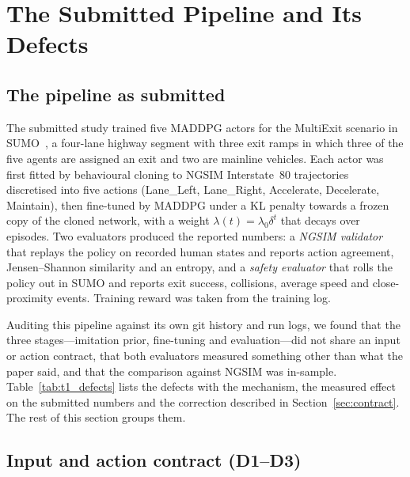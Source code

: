 \section{The Submitted Pipeline and Its Defects}
\label{sec:defects}

\subsection{The pipeline as submitted}
\label{sec:pipeline}

The submitted study trained five MADDPG actors for the MultiExit scenario in SUMO~\cite{lopez2018microscopic}, a four-lane highway segment with three exit ramps in which three of the five agents are assigned an exit and two are mainline vehicles. Each actor was first fitted by behavioural cloning to NGSIM Interstate~80 trajectories~\cite{ngsim2006} discretised into five actions (Lane\_Left, Lane\_Right, Accelerate, Decelerate, Maintain), then fine-tuned by MADDPG under a KL penalty towards a frozen copy of the cloned network, with a weight $\lambda(t)=\lambda_0\delta^t$ that decays over episodes. Two evaluators produced the reported numbers: a \emph{NGSIM validator} that replays the policy on recorded human states and reports action agreement, Jensen--Shannon similarity and an entropy, and a \emph{safety evaluator} that rolls the policy out in SUMO and reports exit success, collisions, average speed and close-proximity events. Training reward was taken from the training log.

Auditing this pipeline against its own git history and run logs, we found that the three stages---imitation prior, fine-tuning and evaluation---did not share an input or action contract, that both evaluators measured something other than what the paper said, and that the comparison against NGSIM was in-sample. Table~\ref{tab:t1_defects} lists the defects with the mechanism, the measured effect on the submitted numbers and the correction described in Section~\ref{sec:contract}. The rest of this section groups them.

\subsection{Input and action contract (D1--D3)}
\label{sec:defects_contract}

